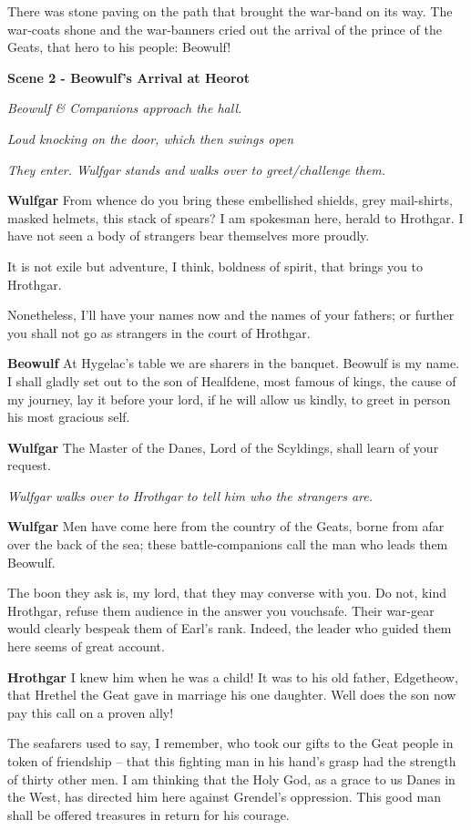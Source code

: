 \documentclass[a4paper]{article}
\begin{document}
{There was stone paving on the path that brought
the war-band on its way. The war-coats shone
and the war-banners cried out the arrival of the prince 
of the Geats, that hero to his people: Beowulf!

\newpage
\centerline{\textbf{Scene 2 - Beowulf's Arrival at Heorot}}
\centerline{\textit{Beowulf \& Companions approach the hall.}}
\centerline{\textit{Loud knocking on the door, which then swings open}}
\centerline{\textit{They enter. Wulfgar stands and walks over to greet/challenge them.}}

\textbf{Wulfgar} From whence do you bring these embellished shields, 
grey mail-shirts, masked helmets, 
this stack of spears? I am spokesman here,
herald to Hrothgar. I have not seen
a body of strangers bear themselves more proudly.

It is not exile but adventure, I think,
boldness of spirit, that brings you to Hrothgar.

Nonetheless, I'll have your names now
and the names of your fathers; or further you shall not go
as strangers in the court of Hrothgar.

\textbf{Beowulf} At Hygelac's table we are sharers in the banquet.
Beowulf is my name.
I shall gladly set out to the son of Healfdene,
most famous of kings, the cause of my journey,
lay it before your lord, if he will allow us kindly,
to greet in person his most gracious self.

\textbf{Wulfgar} The Master of the Danes,
Lord of the Scyldings, shall learn of your request.

\centerline{\textit{Wulfgar walks over to Hrothgar to tell him who the strangers are.}}

\textbf{Wulfgar} Men have come here from the country of the Geats,
borne from afar over the back of the sea;
these battle-companions call the man who leads them Beowulf.

The boon they ask is, my lord, that they may converse with you. 
Do not, kind Hrothgar, refuse them audience in the answer you vouchsafe.
Their war-gear would clearly bespeak them of Earl's rank. 
Indeed, the leader who guided them here seems of great account.

\textbf{Hrothgar} I knew him when he was a child!
It was to his old father, Edgetheow, that
Hrethel the Geat gave in marriage
his one daughter. Well does the son
now pay this call on a proven ally!

The seafarers used to say, I remember,
who took our gifts to the Geat people
in token of friendship – that this fighting man
in his hand's grasp had the strength
of thirty other men. I am thinking that
the Holy God, as a grace to us
Danes in the West, has directed him here
against Grendel's oppression. This good man shall be
offered treasures in return for his courage.

}
\end{document}
